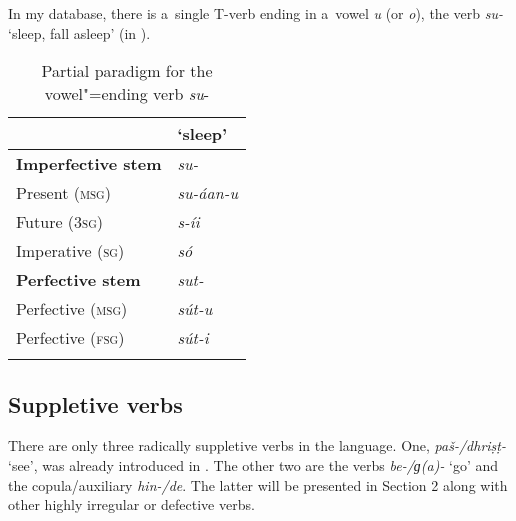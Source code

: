 In my database, there is a~single T-verb ending in a~vowel \textit{u} (or \textit{o}), the verb \textit{su-} `sleep, fall asleep' (in ).


\begin{table}[ht]
\caption{Partial paradigm for the vowel"=ending verb \textit{su}-}

\begin{tabularx}{.5\textwidth}{ l@{\hspace{20pt}} Q }
\lsptoprule
&
\textbf{`sleep'}\\\hline
\textbf{Imperfective stem} &
\textit{su-} \\
Present (\textsc{msg}) &
\textit{su-áan-u} \\
Future (\textsc{3sg}) &
\textit{s-íi} \\
Imperative (\textsc{sg}) &
\textit{só} \\
\textbf{Perfective stem} &
\textit{sut-} \\
Perfective (\textsc{msg}) &
\textit{sút-u} \\
Perfective (\textsc{fsg}) &
\textit{sút-i} \\\lspbottomrule
\end{tabularx}
\label{tab:8-12}
\end{table}


\subsection{Suppletive verbs}
\label{subsec:8-3-11}


There are only three radically suppletive verbs in the language. One, \textit{paš-/dhriṣṭ-} `see', was already introduced in . The other two are the verbs \textit{be-/ɡ(a)-} `go' and the copula/auxiliary \textit{hin-/de}. The latter will be presented in Section 2 along with other highly irregular or defective verbs. 



